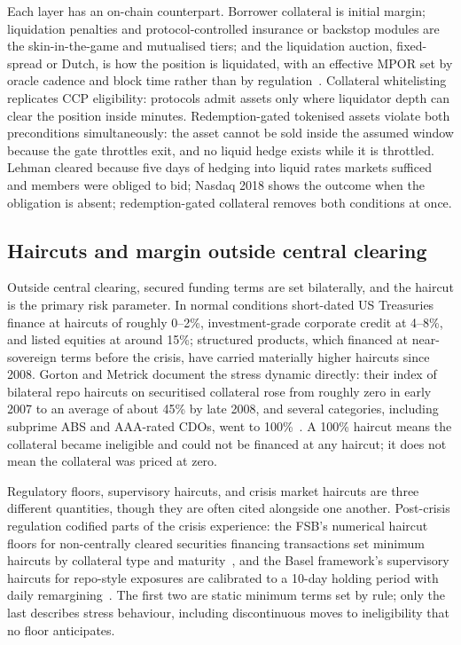 \documentclass[11pt,a4paper]{article}
\begin{document}
Each layer has an on-chain counterpart. Borrower collateral is initial margin; liquidation penalties and protocol-controlled insurance or backstop modules are the skin-in-the-game and mutualised tiers; and the liquidation auction, fixed-spread or Dutch, is how the position is liquidated, with an effective MPOR set by oracle cadence and block time rather than by regulation~\cite{cdr153}. Collateral whitelisting replicates CCP eligibility: protocols admit assets only where liquidator depth can clear the position inside minutes. Redemption-gated tokenised assets violate both preconditions simultaneously: the asset cannot be sold inside the assumed window because the gate throttles exit, and no liquid hedge exists while it is throttled. Lehman cleared because five days of hedging into liquid rates markets sufficed and members were obliged to bid; Nasdaq 2018 shows the outcome when the obligation is absent; redemption-gated collateral removes both conditions at once.

\subsection{Haircuts and margin outside central clearing}

Outside central clearing, secured funding terms are set bilaterally, and the haircut is the primary risk parameter. In normal conditions short-dated US Treasuries finance at haircuts of roughly 0--2\%, investment-grade corporate credit at 4--8\%, and listed equities at around 15\%; structured products, which financed at near-sovereign terms before the crisis, have carried materially higher haircuts since 2008. Gorton and Metrick document the stress dynamic directly: their index of bilateral repo haircuts on securitised collateral rose from roughly zero in early 2007 to an average of about 45\% by late 2008, and several categories, including subprime ABS and AAA-rated CDOs, went to 100\%~\cite{gortonmetrick}. A 100\% haircut means the collateral became ineligible and could not be financed at any haircut; it does not mean the collateral was priced at zero.

Regulatory floors, supervisory haircuts, and crisis market haircuts are three different quantities, though they are often cited alongside one another. Post-crisis regulation codified parts of the crisis experience: the FSB's numerical haircut floors for non-centrally cleared securities financing transactions set minimum haircuts by collateral type and maturity~\cite{fsb}, and the Basel framework's supervisory haircuts for repo-style exposures are calibrated to a 10-day holding period with daily remargining~\cite{basel}. The first two are static minimum terms set by rule; only the last describes stress behaviour, including discontinuous moves to ineligibility that no floor anticipates.
\end{document}
